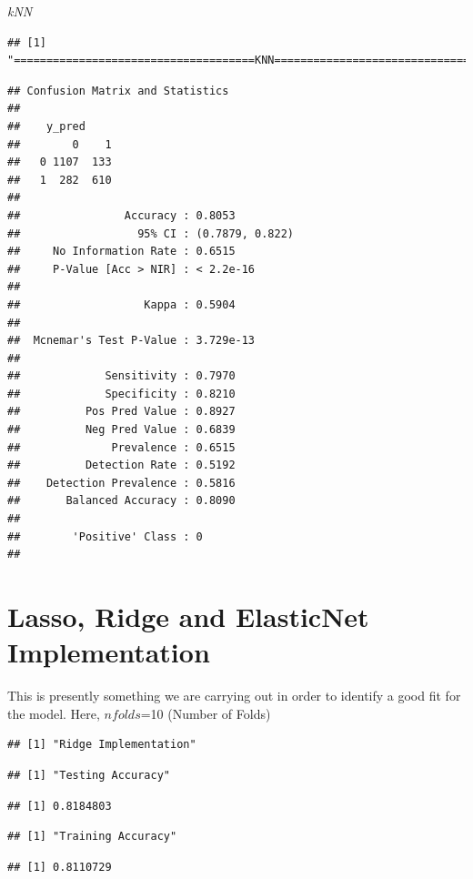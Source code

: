 \documentclass[
]{article}
\begin{document}
\emph{kNN}

\begin{verbatim}
## [1] "=====================================KNN====================================="
\end{verbatim}

\begin{verbatim}
## Confusion Matrix and Statistics
## 
##    y_pred
##        0    1
##   0 1107  133
##   1  282  610
##                                          
##                Accuracy : 0.8053         
##                  95% CI : (0.7879, 0.822)
##     No Information Rate : 0.6515         
##     P-Value [Acc > NIR] : < 2.2e-16      
##                                          
##                   Kappa : 0.5904         
##                                          
##  Mcnemar's Test P-Value : 3.729e-13      
##                                          
##             Sensitivity : 0.7970         
##             Specificity : 0.8210         
##          Pos Pred Value : 0.8927         
##          Neg Pred Value : 0.6839         
##              Prevalence : 0.6515         
##          Detection Rate : 0.5192         
##    Detection Prevalence : 0.5816         
##       Balanced Accuracy : 0.8090         
##                                          
##        'Positive' Class : 0              
## 
\end{verbatim}

\section{Lasso, Ridge and ElasticNet Implementation}

This is presently something we are carrying out in order to identify a
good fit for the model. Here, \(nfolds\)=10 (Number of Folds)

\begin{verbatim}
## [1] "Ridge Implementation"
\end{verbatim}

\begin{verbatim}
## [1] "Testing Accuracy"
\end{verbatim}

\begin{verbatim}
## [1] 0.8184803
\end{verbatim}

\begin{verbatim}
## [1] "Training Accuracy"
\end{verbatim}

\begin{verbatim}
## [1] 0.8110729
\end{verbatim}
\end{document}
